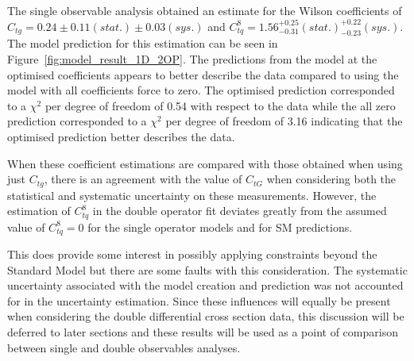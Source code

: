 \documentclass[a4paper,11pt]{article}
\begin{document}
The single observable analysis obtained an estimate for the Wilson coefficients of $C_{tg} = 0.24 \pm 0.11 (stat.) \pm 0.03 (sys.)$ and $C_{tq}^{8}=1.56^{+0.25}_{-0.31} (stat.) ^{+0.22}_{-0.23} (sys.)$.
The model prediction for this estimation can be seen in Figure~\ref{fig:model_result_1D_2OP}.
The predictions from the model at the optimised coefficients appears to better describe the data compared to using the model with all coefficients force to zero.
The optimised prediction corresponded to a $\chi^{2}$ per degree of freedom of 0.54 with respect to the data while the all zero prediction corresponded to a $\chi^{2}$ per degree of freedom of 3.16 indicating that the optimised prediction better describes the data.

When these coefficient estimations are compared with those obtained when using just $C_{tg}$, there is an agreement with the value of $C_{tG}$ when considering both the statistical and systematic uncertainty on these measurements.
However, the estimation of $C_{tq}^{8}$ in the double operator fit deviates greatly from the assumed value of $C_{tq}^{8}=0$ for the single operator models and for SM predictions.

This does provide some interest in possibly applying constraints beyond the Standard Model but there are some faults with this consideration.
The systematic uncertainty associated with the model creation and prediction was not accounted for in the uncertainty estimation.
Since these influences will equally be present when considering the double differential cross section data, this discussion will be deferred to later sections and these results will be used as a point of comparison between single and double observables analyses.
\end{document}
